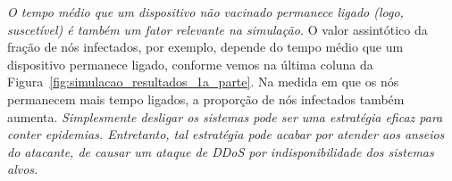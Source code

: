 	    
	    \emph{O tempo médio que um dispositivo não vacinado permanece ligado (logo, suscetível) é também um fator relevante na simulação.} O valor  assintótico da fração de nós infectados, por exemplo, depende do tempo médio que um dispositivo permanece ligado, conforme vemos na última coluna da Figura~\ref{fig:simulacao_resultados_1a_parte}.   Na medida em que os nós permanecem mais tempo ligados, a proporção de nós infectados também aumenta. \emph{ Simplesmente desligar os sistemas pode ser uma estratégia eficaz para conter epidemias. Entretanto, tal estratégia pode acabar por atender aos anseios do atacante, de causar um ataque de DDoS por indisponibilidade dos sistemas alvos.}
	    
